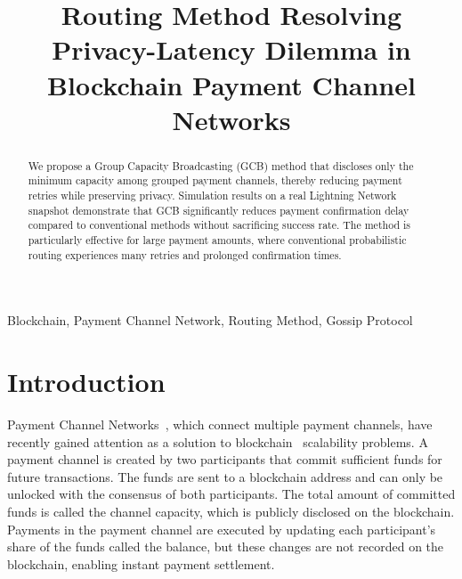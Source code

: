 \documentclass[conference]{IEEEtran}
\begin{document}
\title{Routing Method Resolving Privacy-Latency Dilemma in Blockchain Payment Channel Networks}

\author{
	\and
}

\maketitle

\begin{abstract}
	We propose a Group Capacity Broadcasting (GCB) method that discloses only the minimum capacity among grouped payment channels, thereby reducing payment retries while preserving privacy.
	Simulation results on a real Lightning Network snapshot demonstrate that GCB significantly reduces payment confirmation delay compared to conventional methods without sacrificing success rate.
	The method is particularly effective for large payment amounts, where conventional probabilistic routing experiences many retries and prolonged confirmation times.
\end{abstract}

\begin{IEEEkeywords}
	Blockchain, Payment Channel Network, Routing Method, Gossip Protocol
\end{IEEEkeywords}

\section{Introduction}

Payment Channel Networks~\cite{poon_dryja_2016}, which connect multiple payment channels, have recently gained attention as a solution to blockchain~\cite{nakamoto2008bitcoin} scalability problems.
A payment channel is created by two participants that commit sufficient funds for future transactions.
The funds are sent to a blockchain address and can only be unlocked with the consensus of both participants.
The total amount of committed funds is called the channel capacity, which is publicly disclosed on the blockchain.
Payments in the payment channel are executed by updating each participant's share of the funds called the balance, but these changes are not recorded on the blockchain, enabling instant payment settlement.
\end{document}
